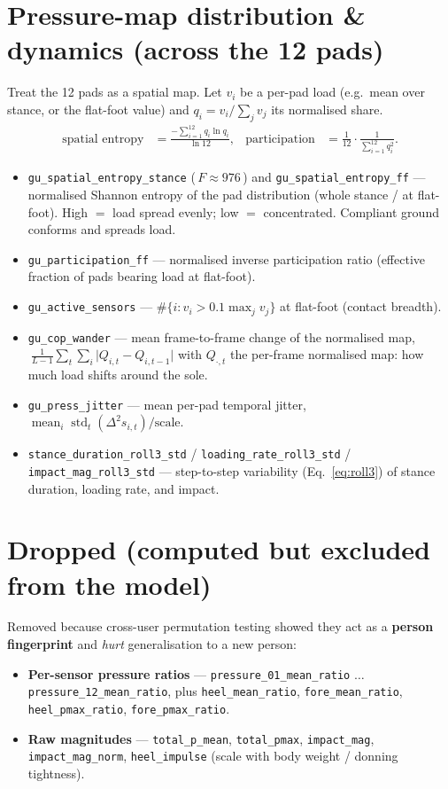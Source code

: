 \documentclass[11pt]{article}
\newcommand{\code}[1]{\texttt{#1}}
\newcommand{\Fval}[1]{{\small(\,$F\!\approx\!#1$\,)}}
\begin{document}
\section{Pressure-map distribution \& dynamics (across the 12 pads)}
Treat the 12 pads as a spatial map. Let $v_i$ be a per-pad load (e.g.\ mean over stance, or the
flat-foot value) and $q_i=v_i/\sum_j v_j$ its normalised share.
\begin{align}
\text{spatial entropy} &= \frac{-\sum_{i=1}^{12} q_i\ln q_i}{\ln 12}, &
\text{participation} &= \frac{1}{12}\cdot\frac{1}{\sum_{i=1}^{12} q_i^{2}} .
\end{align}
\begin{itemize}
  \item \code{gu_spatial_entropy_stance} \Fval{976} and \code{gu_spatial_entropy_ff} --- normalised
  Shannon entropy of the pad distribution (whole stance / at flat-foot). High $=$ load spread
  evenly; low $=$ concentrated. Compliant ground conforms and spreads load.
  \item \code{gu_participation_ff} --- normalised inverse participation ratio (effective fraction of
  pads bearing load at flat-foot).
  \item \code{gu_active_sensors} --- $\#\{i: v_i>0.1\max_j v_j\}$ at flat-foot (contact breadth).
  \item \code{gu_cop_wander} --- mean frame-to-frame change of the normalised map,
  $\ \tfrac1{L-1}\sum_t\sum_i \lvert Q_{i,t}-Q_{i,t-1}\rvert$ with $Q_{\cdot,t}$ the per-frame
  normalised map: how much load shifts around the sole.
  \item \code{gu_press_jitter} --- mean per-pad temporal jitter,
  $\operatorname{mean}_i \operatorname{std}_t(\Delta^2 s_{i,t})/\text{scale}$.
  \item \code{stance_duration_roll3_std} / \code{loading_rate_roll3_std} /
  \code{impact_mag_roll3_std} --- step-to-step variability (Eq.~\eqref{eq:roll3}) of stance
  duration, loading rate, and impact.
\end{itemize}

\section*{Dropped (computed but excluded from the model)}
Removed because cross-user permutation testing showed they act as a \textbf{person fingerprint} and
\emph{hurt} generalisation to a new person:
\begin{itemize}
  \item \textbf{Per-sensor pressure ratios} --- \code{pressure_01_mean_ratio} $\dots$
  \code{pressure_12_mean_ratio}, plus \code{heel_mean_ratio}, \code{fore_mean_ratio},
  \code{heel_pmax_ratio}, \code{fore_pmax_ratio}.
  \item \textbf{Raw magnitudes} --- \code{total_p_mean}, \code{total_pmax}, \code{impact_mag},
  \code{impact_mag_norm}, \code{heel_impulse} (scale with body weight / donning tightness).
\end{itemize}
\end{document}

